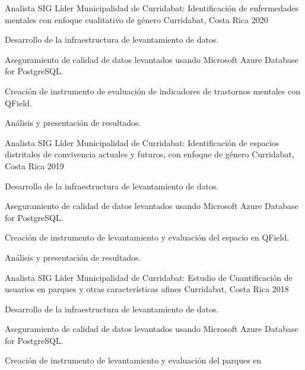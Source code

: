 \begin{cventries}
{}
\cventry
{Analista SIG Líder} %
{Municipalidad de Curridabat: Identificación de enfermedades mentales con
  enfoque cualitativo de género} %
{Curridabat, Costa Rica} %
{2020} %
{
  \begin{cvitems} %
    \item Desarrollo de la infraestructura de levantamiento de datos.
    \item Aseguramiento de calidad de datos levantados usando Microsoft Azure
    Database for PostgreSQL.
    \item Creación de instrumento de evaluación de indicadores de
    trastornos mentales con QField.
    \item Análisis y presentación de resultados.
  \end{cvitems}
}
\cventry
{Analista SIG Líder} %
{Municipalidad de Curridabat: Identificación de espacios distritales
  de convivencia actuales y futuros, con enfoque de género} %
{Curridabat, Costa Rica} %
{2019} %
{
  \begin{cvitems} %
    \item Desarrollo de la infraestructura de levantamiento de datos.
    \item Aseguramiento de calidad de datos levantados usando Microsoft Azure
    Database for PostgreSQL.
    \item Creación de instrumento de levantamiento y evaluación del espacio en
    QField.
    \item Análisis y presentación de resultados.
  \end{cvitems}
}
\cventry
{Analista SIG Líder} %
{Municipalidad de Curridabat: Estudio de Cuantificación de usuarios en parques
  y otras características afines} %
{Curridabat, Costa Rica} %
{2018} %
{
  \begin{cvitems} %
    \item Desarrollo de la infraestructura de levantamiento de datos.
    \item Aseguramiento de calidad de datos levantados usando Microsoft Azure
    Database for PostgreSQL.
    \item Creación de instrumento de levantamiento y evaluación del parques en

\end{cvitems}}
\end{cventries}

